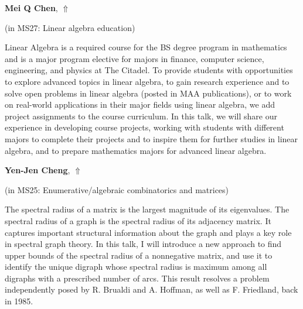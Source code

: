 \documentclass[ILAS2025-program.tex]{subfiles}
\begin{document}
\hypertarget{down0333}{}\begin{ilasabstract}
    
\textbf{Mei Q Chen},  \hfill \hyperlink{up0333}{$\Uparrow$}
    
    
(in {\color{mstitle}MS27: Linear algebra education})
        
\mtskip
    Linear Algebra is a required course for the BS degree program in mathematics
and is a major program elective for majors in finance, computer science,
engineering, and physics at The Citadel. To provide students with
opportunities to explore advanced topics in linear algebra, to gain research
experience and to solve open problems in linear algebra (posted in MAA
publications), or to work on real-world applications in their major fields
using linear algebra, we add project assignments to the course curriculum.
In this talk, we will share our experience in developing course projects,
working with students with different majors to complete their projects and
to inspire them for further studies in linear algebra, and to prepare
mathematics majors for advanced linear algebra.

\end{ilasabstract}
    

\hypertarget{down0228}{}\begin{ilasabstract}
    
\textbf{Yen-Jen Cheng},  \hfill \hyperlink{up0228}{$\Uparrow$}
    
    
(in {\color{mstitle}MS25: Enumerative/algebraic combinatorics and matrices})
        
\mtskip
    The spectral radius of a matrix is the largest magnitude of its eigenvalues. The spectral radius of a graph is the spectral radius of its adjacency matrix. It captures important structural information about the graph and plays a key role in spectral graph theory. In this talk, I will introduce a new approach to find upper bounds of the spectral radius of a nonnegative matrix, and use it to
identify the unique digraph whose spectral radius is
maximum among all digraphs with a prescribed number
of arcs. This result resolves a problem 
independently posed by R. Brualdi and A. Hoffman, as well as F.
Friedland, back in 1985.

\end{ilasabstract}
    
\end{document}
